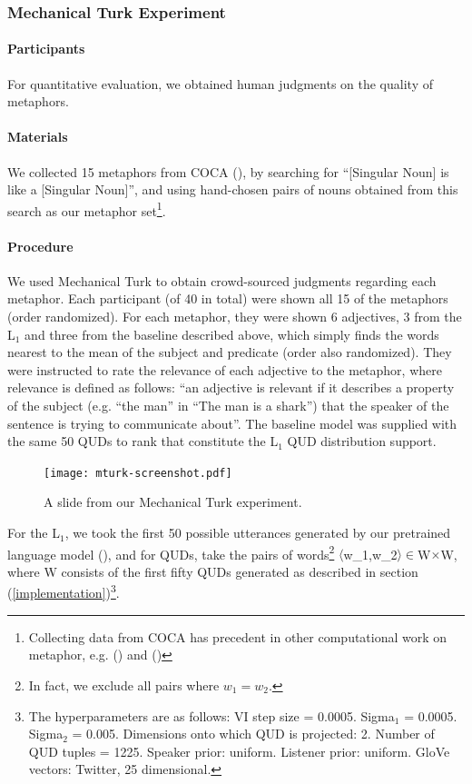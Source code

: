 \documentclass[10pt,letterpaper,twocolumn]{article}
\begin{document}
\subsubsection{Mechanical Turk Experiment}

\paragraph{Participants} For quantitative evaluation, we obtained human judgments on the quality of metaphors. 


\paragraph{Materials} We collected 15 metaphors from COCA (\cite{davies2008corpus}), by searching for ``[Singular Noun] is like a [Singular Noun]'', and using hand-chosen pairs of nouns obtained from this search as our metaphor set\footnote{Collecting data from COCA has precedent in other computational work on metaphor, e.g. (\cite{neuman2013metaphor}) and (\cite{turney2011literal})}.


\paragraph{Procedure} We used Mechanical Turk to obtain crowd-sourced judgments regarding each metaphor. Each participant (of 40 in total) were shown all 15 of the metaphors (order randomized). For each metaphor, they were shown 6 adjectives, 3 from the L$_1$ and three from the baseline described above, which simply finds the words nearest to the mean of the subject and predicate (order also randomized). They were instructed to rate the relevance of each adjective to the metaphor, where relevance is defined as follows: ``an adjective is relevant if it describes a property of the subject (e.g. ``the man'' in ``The man is a shark'') that the speaker of the sentence is trying to communicate about''. The baseline model was supplied with the same 50 QUDs to rank that constitute the L$_1$ QUD distribution support.

\begin{figure} \label{screenshot}
\centerline{\texttt{[image: mturk-screenshot.pdf]}}
\caption{A slide from our Mechanical Turk experiment.} 
\end{figure}

For the L$_1$, we took the first 50 possible utterances generated by our pretrained language model (\cite{jozefowicz2016exploring}), and for QUDs, take the pairs of words\footnote{In fact, we exclude all pairs where $w_1=w_2$.} $\langle$w_1,w_2$\rangle\in$W$\times$W, where W consists of the first fifty QUDs generated as described in section (\ref{implementation})\footnote{The hyperparameters are as follows: VI step size = 0.0005. Sigma$_1$ = 0.0005. Sigma$_2$ = 0.005. Dimensions onto which QUD is projected: 2. Number of QUD tuples = 1225. Speaker prior: uniform. Listener prior: uniform. GloVe vectors: Twitter, 25 dimensional.}.
\end{document}
